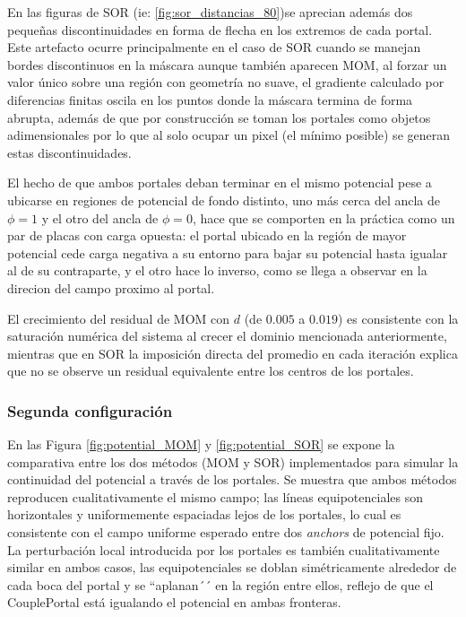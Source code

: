 \documentclass[12pt, twocolumn]{article}
\begin{document}
En las figuras de SOR (ie: \ref{fig:sor_distancias_80})se aprecian además dos pequeñas discontinuidades en forma de flecha en los extremos de cada portal. Este artefacto ocurre principalmente en el caso de SOR cuando se manejan bordes discontinuos en la máscara aunque también aparecen MOM, al forzar un valor único sobre una región con geometría no suave, el gradiente calculado por diferencias finitas oscila en los puntos donde la máscara termina de forma abrupta, además de que por construcción se toman los portales como objetos adimensionales por lo que al solo ocupar un pixel (el mínimo posible) se generan estas discontinuidades.


El hecho de que ambos portales deban terminar en el mismo potencial pese a ubicarse en regiones de potencial de fondo distinto, uno más cerca del ancla de $\phi = 1$ y el otro del ancla de $\phi = 0$, hace que se comporten en la práctica como un par de placas con carga opuesta: el portal ubicado en la región de mayor potencial cede carga negativa a su entorno para bajar su potencial hasta igualar al de su contraparte, y el otro hace lo inverso, como se llega a observar en la direcion del campo proximo al portal.

El crecimiento del residual de MOM con $d$ (de $0.005$ a $0.019$) es consistente con la saturación numérica del sistema al crecer el dominio mencionada anteriormente, mientras que en SOR la imposición directa del promedio en cada iteración explica que no se observe un residual equivalente entre los centros de los portales.

\subsubsection*{Segunda configuración}

En las Figura \ref{fig:potential_MOM} y \ref{fig:potential_SOR} se expone la comparativa entre los dos métodos (MOM y SOR) implementados para simular la continuidad del potencial a través de los portales. Se muestra que ambos métodos reproducen cualitativamente el mismo campo; las líneas equipotenciales son horizontales y uniformemente espaciadas lejos de los portales, lo cual es consistente con el campo uniforme esperado entre dos \textit{anchors} de potencial fijo. La perturbación local introducida por los portales es también cualitativamente similar en ambos casos, las equipotenciales se doblan simétricamente alrededor de cada boca del portal y se ``aplanan´´ en la región entre ellos, reflejo de que el CouplePortal está igualando el potencial en ambas fronteras.
\end{document}
